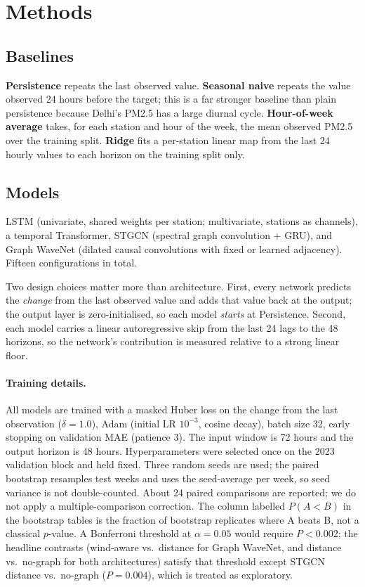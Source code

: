 \documentclass[11pt,a4paper]{article}
\begin{document}
\section{Methods}
\subsection{Baselines}
\textbf{Persistence} repeats the last observed value.
\textbf{Seasonal naive} repeats the value observed 24 hours before the target;
this is a far stronger baseline than plain persistence because Delhi's PM2.5
has a large diurnal cycle.
\textbf{Hour-of-week average} takes, for each station and hour of the week,
the mean observed PM2.5 over the training split.
\textbf{Ridge} fits a per-station linear map from the last 24 hourly values to
each horizon on the training split only.

\subsection{Models}
LSTM (univariate, shared weights per station; multivariate, stations as
channels), a temporal Transformer, STGCN (spectral graph convolution + GRU),
and Graph WaveNet (dilated causal convolutions with fixed or learned adjacency).
Fifteen configurations in total.

Two design choices matter more than architecture.  First, every network
predicts the \emph{change} from the last observed value and adds that value
back at the output; the output layer is zero-initialised, so each model
\emph{starts} at Persistence.  Second, each model carries a linear
autoregressive skip from the last 24 lags to the 48 horizons, so the network's
contribution is measured relative to a strong linear floor.

\paragraph{Training details.}
All models are trained with a masked Huber loss on the change from the last
observation ($\delta=1.0$), Adam (initial LR $10^{-3}$, cosine decay),
batch size 32, early stopping on validation MAE (patience 3).  The input
window is 72 hours and the output horizon is 48 hours.  Hyperparameters were
selected once on the 2023 validation block and held fixed.  Three random seeds
are used; the paired bootstrap resamples test weeks and uses the seed-average
per week, so seed variance is not double-counted.  About 24 paired comparisons
are reported; we do not apply a multiple-comparison correction.  The column
labelled $P(A{<}B)$ in the bootstrap tables is the fraction of bootstrap
replicates where A beats B, not a classical $p$-value.  A Bonferroni threshold
at $\alpha=0.05$ would require $P{<}0.002$; the headline contrasts (wind-aware
vs.\ distance for Graph WaveNet, and distance vs.\ no-graph for both
architectures) satisfy that threshold except STGCN distance vs.\ no-graph
($P=0.004$), which is treated as exploratory.
\end{document}
